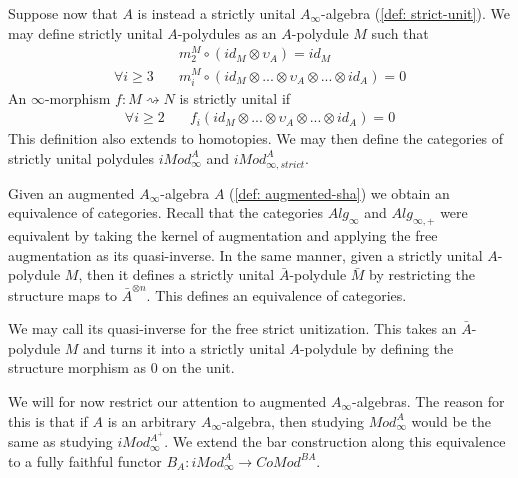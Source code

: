\documentclass[../thesis.tex]{subfiles}
\begin{document}
            Suppose now that $A$ is instead a strictly unital $A_\infty$-algebra (\ref{def: strict-unit}). We may define strictly unital $A$-polydules as an $A$-polydule $M$ such that
            \begin{align*}
                & m^M_2\circ (id_M \otimes \upsilon_A) = id_M \\
                \forall i\geq 3\quad & m^M_i\circ (id_M \otimes ... \otimes \upsilon_A \otimes ... \otimes id_A) = 0
            \end{align*}
            An $\infty$-morphism $f : M \rightsquigarrow N$ is strictly unital if
            \begin{align*}
                \forall i\geq 2 \quad & f_i(id_M \otimes ... \otimes \upsilon_A \otimes ... \otimes id_A) = 0 
            \end{align*}
            This definition also extends to homotopies. We may then define the categories of strictly unital polydules $iMod_\infty^A$ and $iMod_{\infty, strict}^A$.

            Given an augmented $A_\infty$-algebra $A$ (\ref{def: augmented-sha}) we obtain an equivalence of categories. Recall that the categories $Alg_\infty$ and $Alg_{\infty,+}$ were equivalent by taking the kernel of augmentation and applying the free augmentation as its quasi-inverse. In the same manner, given a strictly unital $A$-polydule $M$, then it defines a strictly unital $\bar{A}$-polydule $\bar{M}$ by restricting the structure maps to $\bar{A}^{\otimes n}$. This defines an equivalence of categories.
            \begin{center}
            \end{center}
            We may call its quasi-inverse for the free strict unitization. This takes an $\bar{A}$-polydule $M$ and turns it into a strictly unital $A$-polydule by defining the structure morphism as $0$ on the unit.

            We will for now restrict our attention to augmented $A_\infty$-algebras. The reason for this is that if $A$ is an arbitrary $A_\infty$-algebra, then studying $Mod_\infty^A$ would be the same as studying $iMod_\infty^{A^+}$. We extend the bar construction along this equivalence to a fully faithful functor $B_A : iMod_\infty^A \rightarrow CoMod^{BA}$.
\end{document}

